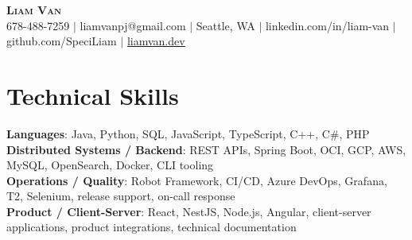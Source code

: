 \documentclass[letterpaper,11pt]{article}
\begin{document}

%
\begin{center}
    \textbf{\Huge \scshape Liam Van} \\ \vspace{1pt}
    \small 678-488-7259 $|$ \small {liamvanpj@gmail.com} $|$ Seattle, WA
 {{$|$ linkedin.com/in/liam-van} {$|$ github.com/SpeciLiam} {$|$ \href{https://liamvan.dev}{liamvan.dev}}}

\end{center}

\section{Technical Skills}
 \begin{itemize}[leftmargin=0.15in, label={}]
    \small{\item{
     \textbf{Languages}{: Java, Python, SQL, JavaScript, TypeScript, C++, C\#, PHP} \\
     \textbf{Distributed Systems / Backend}{: REST APIs, Spring Boot, OCI, GCP, AWS, MySQL, OpenSearch, Docker, CLI tooling} \\
     \textbf{Operations / Quality}{: Robot Framework, CI/CD, Azure DevOps, Grafana, T2, Selenium, release support, on-call response} \\
     \textbf{Product / Client-Server}{: React, NestJS, Node.js, Angular, client-server applications, product integrations, technical documentation} \\
    }}
 \end{itemize}
%
\end{document}
